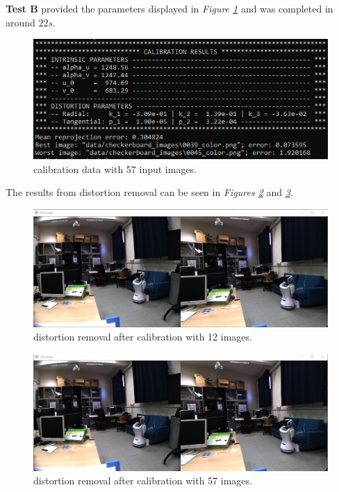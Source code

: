 \documentclass{article}
\begin{document}
\textbf{Test B} provided the parameters displayed in \textit{Figure \ref{img_data_57}} and was completed in around $22s$.

\begin{figure}[h]
\begin{center}
\includegraphics[width=1\textwidth]{images/data_57}
\caption{\footnotesize{calibration data with 57 input images.}}
\label{img_data_57}
\end{center}
\end{figure}

The results from distortion removal can be seen in \textit{Figures \ref{img_result_12}} and\textit{ \ref{img_result_57}}.

\begin{figure}[h]
\begin{center}
\includegraphics[width=1\textwidth]{images/result_12}
\caption{\footnotesize{distortion removal after calibration with 12 images.}}
\label{img_result_12}
\end{center}
\end{figure}

\begin{figure}[h]
\begin{center}
\includegraphics[width=1\textwidth]{images/result_57}
\caption{\footnotesize{distortion removal after calibration with 57 images.}}
\label{img_result_57}
\end{center}
\end{figure}
\end{document}
